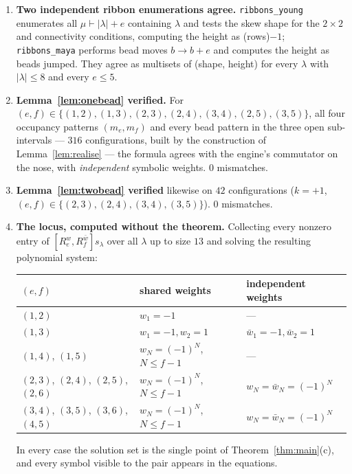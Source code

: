 \documentclass[11pt]{article}
\theoremstyle{definition}
\begin{document}
\begin{enumerate}
\item \textbf{Two independent ribbon enumerations agree.}  \texttt{ribbons\_young}
  enumerates all $\mu\vdash|\lambda|+e$ containing $\lambda$ and tests the skew shape for
  the $2\times2$ and connectivity conditions, computing the height as (rows)$-1$;
  \texttt{ribbons\_maya} performs bead moves $b\to b+e$ and computes the height as beads
  jumped.  They agree as multisets of (shape, height) for every $\lambda$ with
  $|\lambda|\le8$ and every $e\le5$.

\item \textbf{Lemma~\ref{lem:onebead} verified.}  For
  $(e,f)\in\{(1,2),(1,3),(2,3),(2,4),(3,4),(2,5),(3,5)\}$, all four occupancy patterns
  $(m_e,m_f)$ and every bead pattern in the three open sub-intervals --- $316$
  configurations, built by the construction of Lemma~\ref{lem:realise} --- the formula
  agrees with the engine's commutator on the nose, with \emph{independent} symbolic
  weights.  $0$ mismatches.

\item \textbf{Lemma~\ref{lem:twobead} verified} likewise on $42$ configurations
  ($k=+1$, $(e,f)\in\{(2,3),(2,4),(3,4),(3,5)\}$).  $0$ mismatches.

\item \textbf{The locus, computed without the theorem.}  Collecting every nonzero entry
  of $[R_e^{w},R_f^{\bar w}]s_\lambda$ over all $\lambda$ up to size $13$ and solving the
  resulting polynomial system:
  \begin{center}
  \begin{tabular}{lll}
  \hline
  $(e,f)$ & shared weights & independent weights\\
  \hline
  $(1,2)$ & $w_1=-1$ & --- \\
  $(1,3)$ & $w_1=-1,w_2=1$ & $\bar w_1=-1,\bar w_2=1$\\
  $(1,4)$, $(1,5)$ & $w_N=(-1)^N$, $N\le f-1$ & --- \\
  $(2,3)$, $(2,4)$, $(2,5)$, $(2,6)$ & $w_N=(-1)^N$, $N\le f-1$ &
      $w_N=\bar w_N=(-1)^N$\\
  $(3,4)$, $(3,5)$, $(3,6)$, $(4,5)$ & $w_N=(-1)^N$, $N\le f-1$ &
      $w_N=\bar w_N=(-1)^N$\\
  \hline
  \end{tabular}
  \end{center}
  In every case the solution set is the single point of Theorem~\ref{thm:main}(c), and
  every symbol visible to the pair appears in the equations.


\end{enumerate}
\end{document}
